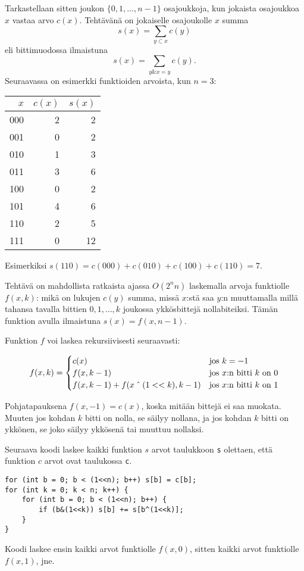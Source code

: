 Tarkastellaan sitten
joukon $\{0,1,\ldots,n-1\}$ osajoukkoja,
kun jokaista osajoukkoa $x$ vastaa arvo $c(x)$.
Tehtävänä on jokaiselle osajoukolle $x$
summa
\[s(x)=\sum_{y \subset x} c(y) \]
eli bittimuodossa ilmaistuna
\[s(x)=\sum_{y \& x = y} c(y). \]
Seuraavassa on esimerkki funktioiden arvoista,
kun $n=3$:
\begin{center}
\begin{tabular}{rrr}
$x$ & $c(x)$ & $s(x)$ \\
\hline
000 & 2 & 2 \\
001 & 0 & 2 \\
010 & 1 & 3 \\
011 & 3 & 6 \\
100 & 0 & 2 \\
101 & 4 & 6 \\
110 & 2 & 5 \\
111 & 0 & 12 \\
\end{tabular}
\end{center}
Esimerkiksi $s(110)=c(000)+c(010)+c(100)+c(110)=7$. 

Tehtävä on mahdollista ratkaista ajassa $O(2^n n)$
laskemalla arvoja funktiolle $f(x,k)$:
mikä on lukujen $c(y)$ summa, missä $x$:stä saa $y$:n
muuttamalla millä tahansa tavalla bittien $0,1,\ldots,k$
joukossa ykkösbittejä nollabiteiksi.
Tämän funktion avulla ilmaistuna $s(x)=f(x,n-1)$.

Funktion $f$ voi laskea rekursiivisesti seuraavasti:

\begin{equation*}
    f(x,k) = \begin{cases}
               c(x)          & \textrm{jos $k=-1$}\\
               f(x,k-1)          & \textrm{jos $x$:n bitti $k$ on 0}\\
               f(x,k-1)+f(x \XOR (1 < < k),k-1)    & \textrm{jos $x$:n bitti $k$ on 1}\\
           \end{cases}
\end{equation*}

Pohjatapauksena $f(x,-1)=c(x)$,
koska mitään bittejä ei saa muokata.
Muuten jos kohdan $k$ bitti on nolla,
se säilyy nollana, ja jos kohdan $k$ bitti on ykkönen,
se joko säilyy ykkösenä tai muuttuu nollaksi.

Seuraava koodi laskee kaikki funktion $s$ arvot taulukkoon
\texttt{s} olettaen, että funktion $c$ arvot ovat
taulukossa \texttt{c}.
\begin{lstlisting}
for (int b = 0; b < (1<<n); b++) s[b] = c[b];
for (int k = 0; k < n; k++) {
    for (int b = 0; b < (1<<n); b++) {
        if (b&(1<<k)) s[b] += s[b^(1<<k)];
    }
}
\end{lstlisting}
Koodi laskee ensin kaikki arvot funktiolle $f(x,0)$,
sitten kaikki arvot funktiolle $f(x,1)$, jne.

